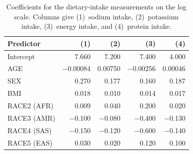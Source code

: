 \begin{table}[ht]
\centering
\caption{Coefficients for the dietary-intake measurements on the log scale. Columns give (1)~sodium intake, (2)~potassium intake, (3)~energy intake, and (4)~protein intake.}
\label{tab:app_coef_nutrients}
\small
\begin{tabular}{lrrrr}
\hline
\textbf{Predictor} & \textbf{(1)} & \textbf{(2)} & \textbf{(3)} & \textbf{(4)} \\
\hline
Intercept    &    7.660 &    7.200 &    7.400 &    4.000 \\
AGE          & $-$0.00084 &  0.00750 & $-$0.00256 &  0.00046 \\
SEX          &    0.270 &    0.177 &    0.160 &    0.187 \\
BMI          &    0.018 &    0.010 &    0.014 &    0.017 \\
RACE2 (AFR)  &    0.009 &    0.040 &    0.200 &    0.020 \\
RACE3 (AMR)  & $-$0.100 & $-$0.080 & $-$0.400 & $-$0.130 \\
RACE4 (SAS)  & $-$0.150 & $-$0.120 & $-$0.600 & $-$0.140 \\
RACE5 (EAS)  &    0.030 &    0.020 &    0.120 &    0.100 \\
\hline
\end{tabular}
\end{table}

